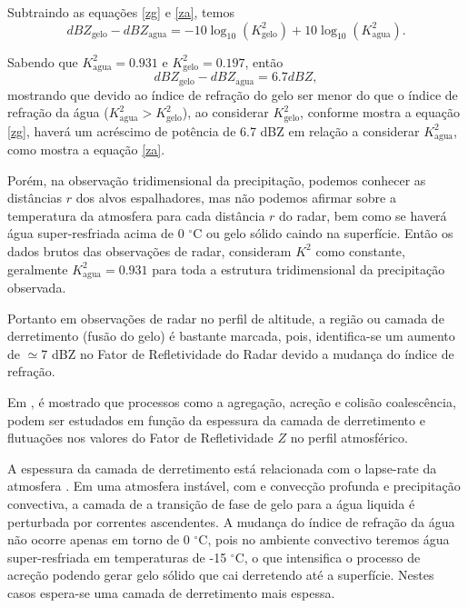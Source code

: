 Subtraindo as equações \ref{zg} e \ref{za}, temos
\begin{equation}
dBZ_{\mathrm{gelo}} - dBZ_{\mathrm{agua}} = - 10\log_{10}(K_{\mathrm{gelo}}^2 )+ 10\log_{10}(K_{\mathrm{agua}}^2).
\end{equation}

Sabendo que $K_{\mathrm{agua}}^2 = 0.931$ e $K_{\mathrm{gelo}}^2= 0.197$, então 
\begin{equation}
dBZ_{\mathrm{gelo}} - dBZ_{\mathrm{agua}} =   6.7dBZ,
\end{equation}
mostrando que devido ao índice de refração do gelo ser menor do que o índice de refração da água ($K_{\mathrm{agua}}^2 > K_{\mathrm{gelo}}^2$), ao considerar $K_{\mathrm{gelo}}^2$, conforme mostra a equação \ref{zg}, haverá um acréscimo de potência de  6.7 dBZ em relação a considerar $K_{\mathrm{agua}}^2$, como mostra a equação \ref{za}.

Porém, na observação tridimensional da precipitação, podemos conhecer as distâncias $r$ dos alvos espalhadores, mas não podemos afirmar sobre a temperatura da atmosfera para cada distância $r$ do radar, bem como se haverá água super-resfriada acima de 0 $^{\circ}$C ou gelo sólido caindo na superfície. Então os dados brutos das observações de radar, consideram $K^2$ como constante, geralmente $K_{\mathrm{agua}}^2 = 0.931$  para toda a estrutura tridimensional da precipitação observada.

Portanto em observações de radar no perfil de altitude, a região ou camada de derretimento (fusão do gelo) é bastante marcada, pois, identifica-se um aumento de $\simeq$7 dBZ no Fator de Refletividade do Radar devido a mudança do índice de refração.

Em , é mostrado que processos como a agregação, acreção e colisão coalescência, podem ser estudados em função da espessura da camada de derretimento e flutuações nos valores do Fator de Refletividade $Z$ no perfil atmosférico. 

A espessura da camada de derretimento está relacionada com o lapse-rate da atmosfera \cite[p.~462]{mason1971_2ed}. Em uma atmosfera instável, com e convecção profunda e precipitação convectiva, a camada de a transição de fase de gelo para a água liquida é perturbada por correntes ascendentes. A mudança do índice de refração da água não ocorre apenas em torno de 0 $^{\circ}$C, pois no ambiente convectivo teremos água super-resfriada em temperaturas de -15 $^{\circ}$C, o que intensifica o processo de acreção podendo gerar gelo sólido que cai derretendo até a superfície. Nestes casos espera-se uma camada de derretimento mais espessa.

